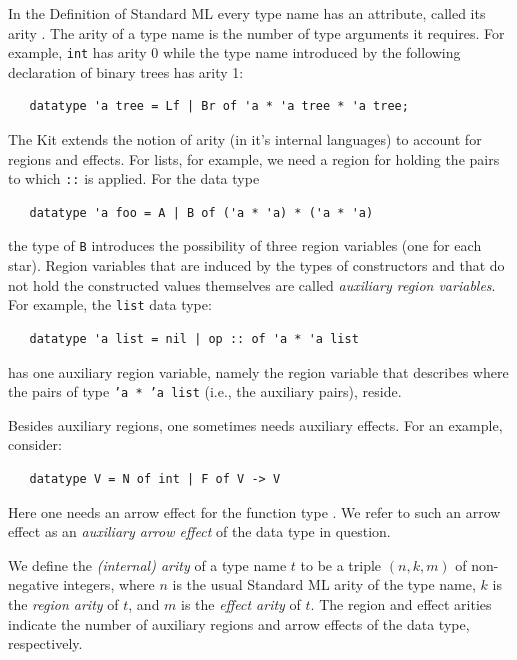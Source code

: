 \documentclass[12pt]{book}
\begin{document}
In the Definition of Standard ML every type name has an attribute,
called its arity \cite{mthm97}. The arity of a type name is the number
of type arguments it requires. For example, {\tt int} has arity 0
while the type name introduced by the following declaration of binary
trees has arity 1:
%
%
%
%
\begin{verbatim}
   datatype 'a tree = Lf | Br of 'a * 'a tree * 'a tree;
\end{verbatim}

The Kit extends the notion of arity (in it's internal languages) to
account for regions and effects. For lists, for example, we need a
region for holding the pairs to which {\tt ::} is applied. For the
data type
\begin{verbatim}
   datatype 'a foo = A | B of ('a * 'a) * ('a * 'a)
\end{verbatim}
the type of {\tt B} introduces the possibility of three region
variables (one for each star). Region variables that are induced by
the types of constructors and that do not hold the constructed values
themselves are called
%
{\em auxiliary region variables}. For example, the {\tt list} data
type:
\begin{verbatim}
   datatype 'a list = nil | op :: of 'a * 'a list
\end{verbatim}
has one auxiliary region variable, namely the region variable that
describes where the pairs of type {\tt 'a * 'a list} (i.e., the
auxiliary
%
pairs), reside.

Besides auxiliary regions, one sometimes needs auxiliary effects.  For
an example, consider:
\begin{verbatim}
   datatype V = N of int | F of V -> V
\end{verbatim}
Here one needs an arrow effect for the function type .
We refer to such an arrow effect as an
%
{\em auxiliary arrow effect} of the data type in question.


We define the {\em (internal) arity} of a type name $t$ to be a triple
$(n,k,m)$ of non-negative integers, where $n$ is the usual Standard ML
arity of the type name, $k$ is the
%
{\em region arity} of $t$, and $m$ is the 
%
{\em effect arity} of $t$. The region and effect arities indicate the
number of auxiliary regions and arrow effects of the data type,
respectively.
\end{document}
